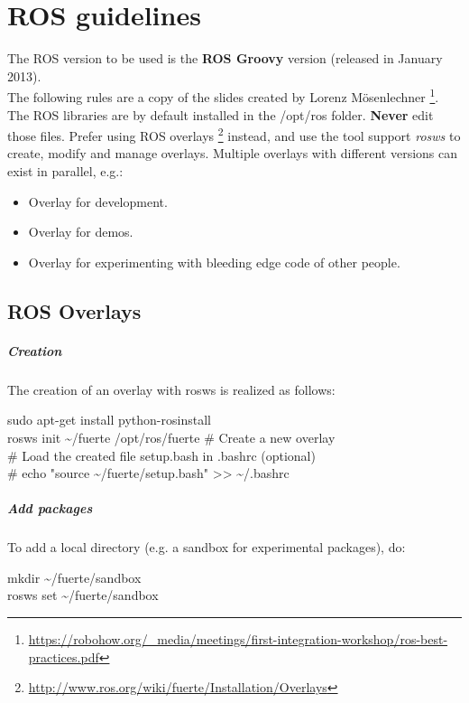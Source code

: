 \chapter{ROS guidelines}

The ROS version to be used is the \textbf{ROS Groovy} version (released in January 2013).\\


The following rules are a copy of the slides created by Lorenz M\"osenlechner \footnote{\url{https://robohow.org/_media/meetings/first-integration-workshop/ros-best-practices.pdf}}.\\

The ROS libraries are by default installed in the /opt/ros folder. 
\textbf{Never} edit those files. Prefer using ROS overlays \footnote{\url{http://www.ros.org/wiki/fuerte/Installation/Overlays}} instead, 
and use the tool support \textit{rosws} to create, modify and manage overlays.
Multiple overlays with different versions can exist in parallel, e.g.:
\begin{itemize}
\item Overlay for development.
\item Overlay for demos.
\item Overlay for experimenting with bleeding edge code of other people.
\end{itemize}

\section{ROS Overlays}
\paragraph{Creation}
The creation of an overlay with rosws is realized as follows:\\
\begin{tt}
sudo apt-­get install python-rosinstall\\
rosws init \textasciitilde/fuerte /opt/ros/fuerte \# Create a new overlay\\
\# Load the created file setup.bash in .bashrc (optional)\\
\# echo "source \textasciitilde/fuerte/setup.bash" >> \textasciitilde/.bashrc \\
\end{tt}

\paragraph{Add packages}
To add a local directory (e.g. a sandbox for experimental packages), do:\\
\begin{tt}
mkdir \textasciitilde/fuerte/sandbox\\
rosws set \textasciitilde/fuerte/sandbox\\
\end{tt}

